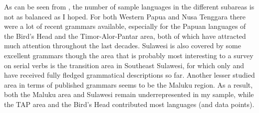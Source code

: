 \newpage
As can be seen from , the number of sample languages in the different subareas is not as balanced as I hoped. For both Western Papua and Nusa Tenggara there were a lot of recent grammars available, especially for the Papuan languages of the Bird's Head and the Timor-Alor-Pantar area, both of which have attracted much attention throughout the last decades. Sulawesi is also covered by some excellent grammars though the area that is probably most interesting to a survey on serial verbs is the transition area in Southeast Sulawesi, for which only  \citep{vandenberg1989} and  \citep{donohue1999} have received fully fledged grammatical descriptions so far. Another lesser studied area in terms of published grammars seems to be the Maluku region. As a result, both the Maluku area and Sulawesi remain underrepresented in my sample, while the TAP area and the Bird's Head contributed most languages (and data points).

